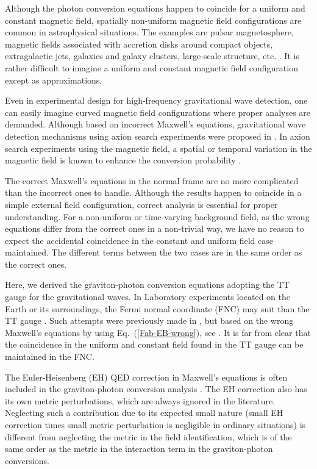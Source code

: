 \documentclass[twocolumn,amsmath,amssymb]{revtex4}
\begin{document}
Although the photon conversion equations happen to coincide for a uniform and constant magnetic field, spatially non-uniform magnetic field configurations are common in astrophysical situations. The examples are pulsar magnetosphere, magnetic fields associated with accretion disks around compact objects, extragalactic jets, galaxies and galaxy clusters, large-scale structure, etc. \cite{Zeldovich-Ruzmaikin-Sokoloff-1983}. It is rather difficult to imagine a uniform and constant magnetic field configuration except as approximations.

Even in experimental design for high-frequency gravitational wave detection, one can easily imagine curved magnetic field configurations \cite{Domcke-2022} where proper analyses are demanded. Although based on incorrect Maxwell's equations, gravitational wave detection mechanisms using axion search experiments were proposed in \cite{Berlin-2022, Domcke-2022}. In axion search experiments using the magnetic field, a spatial or temporal variation in the magnetic field is known to enhance the conversion probability \cite{Seong-2023}.

The correct Maxwell's equations in the normal frame are no more complicated than the incorrect ones to handle. Although the results happen to coincide in a simple external field configuration, correct analysis is essential for proper understanding. For a non-uniform or time-varying background field, as the wrong equations differ from the correct ones in a non-trivial way, we have no reason to expect the accidental coincidence in the constant and uniform field case maintained. The different terms between the two cases are in the same order as the correct ones.

Here, we derived the graviton-photon conversion equations adopting the TT gauge for the gravitational waves. In Laboratory experiments located on the Earth or its surroundings, the Fermi normal coordinate (FNC) may suit than the TT gauge \cite{Maggiore-2007}. Such attempts were previously made in \cite{Berlin-2022, Domcke-2022}, but based on the wrong Maxwell's equations by using Eq.\ (\ref{Fab-EB-wrong}), see \cite{EM-definition}. It is far from clear that the coincidence in the uniform and constant field found in the TT gauge can be maintained in the FNC.

The Euler-Heisenberg (EH) QED correction in Maxwell's equations is often included in the graviton-photon conversion analysis \cite{Raffelt-1988, Ramazanov-2023}. The EH correction also has its own metric perturbations, which are always ignored in the literature. Neglecting such a contribution due to its expected small nature (small EH correction times small metric perturbation is negligible in ordinary situations) is different from neglecting the metric in the field identification, which is of the same order as the metric in the interaction term in the graviton-photon conversions.
\end{document}
